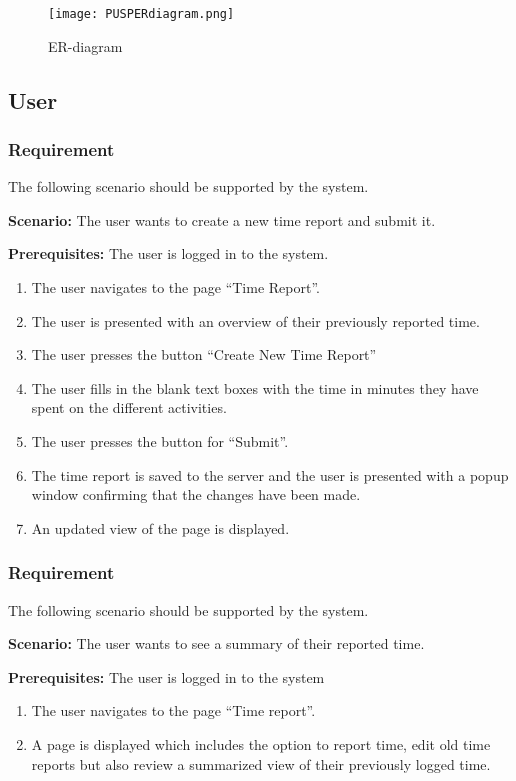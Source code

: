 \documentclass{article}
\begin{document}
\begin{figure}[ht]
\centering
\texttt{[image: PUSPERdiagram.png]}
\caption{ER-diagram}
\end{figure}

\subsection{User}


\subsubsection{Requirement}
The following scenario should be supported by the system.

\textbf{Scenario:} The user wants to create a new time report and submit it. 

\textbf{Prerequisites:} The user is logged in to the system.

\begin{enumerate}


\item The user navigates to the page “Time Report”. 
\item The user is presented with an overview of their previously reported time. 
\item The user presses the button “Create New Time Report”
\item The user fills in the blank text boxes with the time in minutes they have spent on the different activities.
\item The user presses the button for “Submit”.
\item The time report is saved to the server and the user is presented with a popup window confirming that the changes have been made.
\item An updated view of the page is displayed.
\end{enumerate}

\subsubsection{Requirement}
The following scenario should be supported by the system.

\textbf{Scenario:} The user wants to see a summary of their reported time.

\textbf{Prerequisites:} The user is logged in to the system
\begin{enumerate}


\item The user navigates to the page “Time report”.
\item A page is displayed which includes the option to report time, edit old time reports but also review a summarized view of their previously logged time. 
\end{enumerate}
\end{document}

